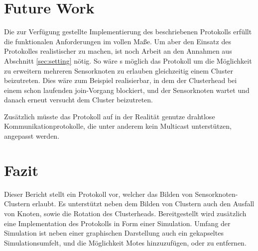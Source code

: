 \section{Future Work} \label{sec:futwork}
Die zur Verf\"ugung gestellte Implementierung des beschriebenen Protokolls erf\"ullt die funktionalen Anforderungen im vollen Ma\ss e.
Um aber den Einsatz des Protokolles realistischer zu machen, ist noch Arbeit an den Annahmen aus Abschnitt \ref{sec:setting} n\"otig.
So w\"are s m\"oglich das Protokoll um die M\"oglichkeit zu erweitern mehreren Sensorknoten zu erlauben gleichzeitig einem Cluster beizutreten.
Dies w\"are zum Beispiel realisierbar, in dem der Clusterhead bei einem schon laufenden join-Vorgang blockiert, und der Sensorknoten wartet und danach erneut versucht dem Cluster beizutreten.

Zus\"atzlich m\"usste das Protokoll auf in der Realität genutze drahtlose Kommunikationprotokolle, die unter anderem kein Multicast unterst\"utzen, angepasst werden.

\section{Fazit} \label{sec:conclusion}
Dieser Bericht stellt ein Protokoll vor, welcher das Bilden von  Sensorknoten-Clustern erlaubt. Es unterst\"utzt neben dem Bilden von Clustern auch den Ausfall von Knoten, sowie die Rotation des Clusterheads.
Bereitgestellt wird zus\"atzlich eine Implementation des Protokolls in Form einer Simulation. Umfang der Simulation ist neben einer graphischen Darstellung auch ein gekapseltes Simulationsumfelt, und die Möglichkeit Motes hinzuzufügen, oder zu entfernen.
